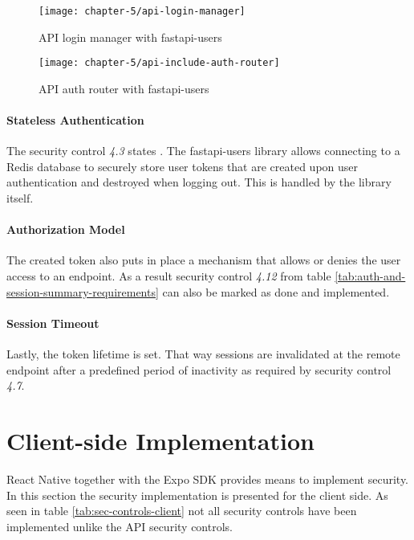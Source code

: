 \begin{figure}
    \centering
    \texttt{[image: chapter-5/api-login-manager]}
    \caption{API login manager with fastapi-users}
    \label{code:api-login-manager}
\end{figure}

\begin{figure}
    \centering
    \texttt{[image: chapter-5/api-include-auth-router]}
    \caption{API auth router with fastapi-users}
    \label{code:api-auth-router}
\end{figure}

\paragraph{Stateless Authentication}
The security control \emph{4.3} states . The fastapi-users library allows connecting to a Redis database to securely store user tokens that are created upon user authentication and destroyed when logging out. This is handled by the library itself. 

\paragraph{Authorization Model}
The created token also puts in place a mechanism that allows or denies the user access to an endpoint. As a result security control \emph{4.12} from table \ref{tab:auth-and-session-summary-requirements} can also be marked as done and implemented. 

\paragraph{Session Timeout}
Lastly, the token lifetime is set. That way sessions are invalidated at the remote endpoint after a predefined period of inactivity as required by security control \emph{4.7}.

\section{Client-side Implementation}
React Native together with the Expo SDK provides means to implement security. In this section the security implementation is presented for the client side. As seen in table \ref{tab:sec-controls-client} not all security controls have been implemented unlike the API security controls.

